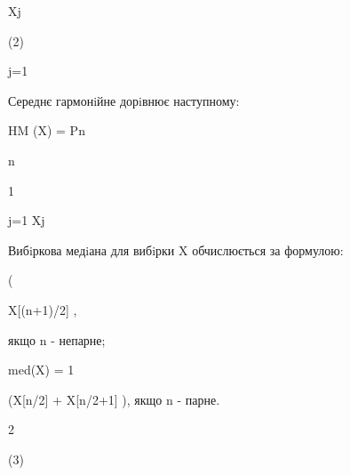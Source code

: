 \documentclass[a4paper,portrait,12pt]{article}
\begin{document}
\begin{flushleft}
Xj
\end{flushleft}


(2)


\begin{flushleft}
j=1
\end{flushleft}





\begin{flushleft}
Середнє гармонiйне дорiвнює наступному:
\end{flushleft}


\begin{flushleft}
HM (X) = Pn
\end{flushleft}





\begin{flushleft}
n
\end{flushleft}





1


\begin{flushleft}
j=1 Xj
\end{flushleft}





\begin{flushleft}
Вибiркова медiана для вибiрки X обчислюється за формулою:
\end{flushleft}


(


\begin{flushleft}
X[(n+1)/2] ,
\end{flushleft}


\begin{flushleft}
якщо n - непарне;
\end{flushleft}


\begin{flushleft}
med(X) = 1
\end{flushleft}


\begin{flushleft}
(X[n/2] + X[n/2+1] ), якщо n - парне.
\end{flushleft}


2





(3)
\end{document}
